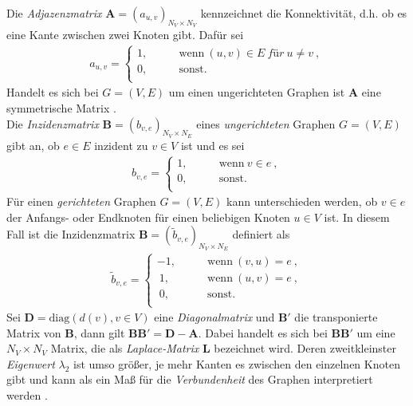 \documentclass[12pt, a4paper]{report}\usepackage[]{graphicx}\usepackage[]{color}
\begin{document}
Die \textit{Adjazenzmatrix} $\textbf{A}=(a_{u,v})_{N_V \times N_V}$ kennzeichnet die Konnektivität, d.h. ob es eine Kante zwischen zwei Knoten gibt. Dafür sei 
\begin{align}
a_{u,v} = \begin{cases}
1, \qquad &\text{wenn} \ (u,v) \in E \ \textit{für} \ u \neq v \ ,\\
0, \qquad &\text{sonst.}\\
\end{cases}
\end{align}
Handelt es sich bei $G=(V,E)$ um einen ungerichteten Graphen ist $\textbf{A}$ eine symmetrische Matrix \cite{kolaczyk2009statistical}.\\
Die \textit{Inzidenzmatrix} $\textbf{B}=(b_{v,e})_{N_V \times N_E}$ eines \textit{ungerichteten} Graphen $G=(V,E)$ gibt an, ob $e \in E$ inzident zu $v \in V$ ist \cite{kolaczyk2009statistical} und es sei
\begin{align}
b_{v,e} = \begin{cases}
1, \qquad &\text{wenn} \ v \in e \ ,\\
0, \qquad &\text{sonst.}\\
\end{cases}
\end{align}
Für einen \textit{gerichteten} Graphen $G=(V,E)$ kann unterschieden werden, ob $v \in e$ der Anfangs- oder Endknoten für einen beliebigen Knoten $u \in V$ ist. In diesem Fall ist die Inzidenzmatrix $\textbf{\~B}=(\tilde{b}_{v,e})_{N_V \times N_E}$ definiert \cite{brandes2005graphfunda} als
\begin{align}
\tilde{b}_{v,e} = \begin{cases}
-1, \qquad &\text{wenn} \ (v,u) = e \  ,\\
\ 1, \qquad &\text{wenn} \ (u,v) = e \ ,\\
\ 0, \qquad &\text{sonst.}\\
\end{cases}
\end{align}
Sei $\textbf{D}=\text{diag}(d(v), v \in V)$ eine \textit{Diagonalmatrix} und $\textbf{\~B}'$ die transponierte Matrix von $\textbf{\~B}$, dann gilt $\textbf{\~B\~B}'=\textbf{D}-\textbf{A}$. Dabei handelt es sich bei $\textbf{\~B\~B}'$ um eine $N_V \times N_V$ Matrix, die als \textit{Laplace-Matrix} $\textbf{L}$ bezeichnet wird. Deren zweitkleinster \textit{Eigenwert} $\lambda_2$ ist umso größer, je mehr Kanten es zwischen den einzelnen Knoten gibt und kann als ein Maß für die \textit{Verbundenheit} des Graphen interpretiert werden \cite{kolaczyk2009statistical}.\\ 
\begin{comment}
Für die \textit{normierte Laplace-Matrix} $\textbf{\~L}$ gilt $\textbf{\~L}=\textbf{D}^{1/2}\textbf{L}\textbf{D}^{1/2}$, wobei $\textbf{D}^{1/2}=\text{diag}\frac{1}{\sqrt{d(v)}}$ für $d(v) \neq 0$ und ansonsten $0$ ist \cite{brandes2005graphfunda}.
\end{comment}
\end{document}
